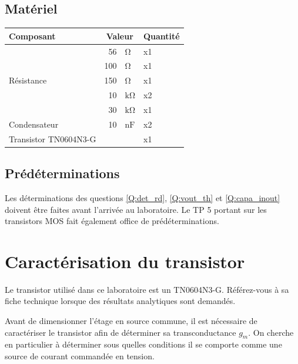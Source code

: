 \documentclass{../template/labo}
\begin{document}
\subsection{Matériel}

\begin{center}
	\begin{tabular}{p{}rlp{}}
		Composant & \multicolumn{2}{c}{Valeur} & Quantité \\\toprule
		\multirow{5}{*}{Résistance} & 56 & $\si{\ohm}$ & x1 \\
									& 100 & $\si{\ohm}$ & x1 \\
									& 150 & $\si{\ohm}$ & x1 \\
									& 10 & $\si{\kohm}$ & x2 \\
									& 30 & $\si{\kohm}$ & x1 \\\midrule
		\multirow{1}{*}{Condensateur} 	& 10 & $\si{\nano\farad}$ & x2 \\\midrule
		Transistor TN0604N3-G & & & x1 \\\bottomrule
	\end{tabular}
	\end{center}

\subsection{Prédéterminations}

Les déterminations des questions \ref{Q:det_rd}, \ref{Q:vout_th} et \ref{Q:capa_inout} doivent être faites avant l'arrivée au laboratoire.
Le TP 5 portant sur les transistors MOS fait également office de prédéterminations.


\section{Caractérisation du transistor}

\begin{info}
Le transistor utilisé dans ce laboratoire est un TN0604N3-G. Référez-vous à sa fiche technique lorsque des résultats analytiques sont demandés.

Avant de dimensionner l'étage en source commune, il est nécessaire de caractériser le transistor afin de déterminer sa transconductance $g_m$. %
On cherche en particulier à déterminer sous quelles conditions il se comporte comme une source de courant commandée en tension.
\end{info}
\end{document}
